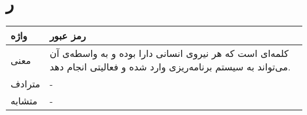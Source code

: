 \section*{ر}%
\begin{table}[H]
	\centering
	\begin{tabular}{| p{1.5cm} | p{5cm} |}
		\hline
		واژه & رمز عبور \\
		\hline
		معنی  & کلمه‌ای است که هر نیروی انسانی دارا بوده و به واسطه‌ی آن می‌تواند  به سیستم برنامه‌ریزی وارد شده و فعالیتی انجام دهد. \\
		\hline
		مترادف & - \\
		\hline
		متشابه  & - \\
		\hline
	\end{tabular}
\end{table}

